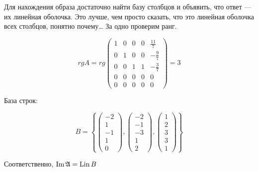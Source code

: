 \documentclass[12pt, a4paper]{article}
\begin{document}
    Для нахождения образа достаточно найти базу столбцов и объявить, что ответ — их линейная оболочка.
    Это лучше, чем просто сказать, что это линейная оболочка всех столбцов, понятно почему…
    За одно проверим ранг.

    \begin{equation}
        rg A = rg \begin{pmatrix}
            1 & 0 & 0 & 0 & \frac{11}{7} \\
            0 & 1 & 0 & 0 & -\frac{9}{7} \\
            0 & 0 & 1 & 1 & -\frac{3}{7} \\
            0 & 0 & 0 & 0 & 0 \\
            0 & 0 & 0 & 0 & 0
        \end{pmatrix} = 3
    \end{equation}

    База строк: 

    \begin{equation}
        B = \left\{ 
            \begin{pmatrix}
                -2 \\ 1 \\ -1 \\ 1 \\ 0
            \end{pmatrix},
            \begin{pmatrix}
                -2 \\ -1 \\ -3 \\ 1 \\ 2
            \end{pmatrix},
            \begin{pmatrix}
                1 \\ 2 \\ 3 \\ 3 \\ 1
            \end{pmatrix}
        \right\}
    \end{equation}

    Соответственно, $\operatorname{Im} \mathfrak{A} = \operatorname{Lin} B$
\end{document}

